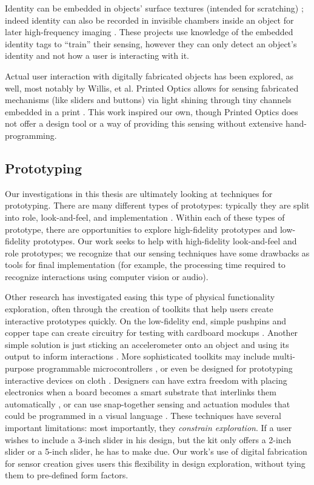         Identity can be embedded in objects' surface textures (intended for scratching) \cite{harrison-acoustic}; indeed identity can also be recorded in invisible chambers inside an object for later high-frequency imaging \cite{willis-infrastructs}. These projects use knowledge of the embedded identity tags to ``train'' their sensing, however they can only detect an object's identity and not how a user is interacting with it.
        
        Actual user interaction with digitally fabricated objects has been explored, as well, most notably by Willis, et al. Printed Optics allows for sensing fabricated mechanisms (like sliders and buttons) via light shining through tiny channels embedded in a print \cite{willis-printedoptics}. This work inspired our own, though Printed Optics does not offer a design tool or a way of providing this sensing without extensive hand-programming.

\subsection{Prototyping}

    Our investigations in this thesis are ultimately looking at techniques for prototyping. There are many different types of prototypes: typically they are split into role, look-and-feel, and implementation \cite{houde-prototypes}. Within each of these types of prototype, there are opportunities to explore high-fidelity prototypes and low-fidelity prototypes. Our work seeks to help with high-fidelity look-and-feel and role prototypes; we recognize that our sensing techniques have some drawbacks as tools for final implementation (for example, the processing time required to recognize interactions using computer vision or audio).
    
    Other research has investigated easing this type of physical functionality exploration, often through the creation of toolkits that help users create interactive prototypes quickly. On the low-fidelity end, simple pushpins and copper tape can create circuitry for testing with cardboard mockups \cite{hudson-boxes}. Another simple solution is just sticking an accelerometer onto an object and using its output to inform interactions \cite{hook-making}. More sophisticated toolkits may include multi-purpose programmable microcontrollers \cite{arduino}, or even be designed for prototyping interactive devices on cloth \cite{buechley-lilypad}. Designers can have extra freedom with placing electronics when a board becomes a smart substrate that interlinks them automatically \cite{villar-voodooio}, or can use snap-together sensing and actuation modules \cite{avrahami-switcharoo, greenberg-phidgets, lee-calder} that could be programmed in a visual language \cite{villar-gadgeteer}. These techniques have several important limitations: most importantly, they \emph{constrain exploration}. If a user wishes to include a 3-inch slider in his design, but the kit only offers a 2-inch slider or a 5-inch slider, he has to make due. Our work's use of digital fabrication for sensor creation gives users this flexibility in design exploration, without tying them to pre-defined form factors.
    
